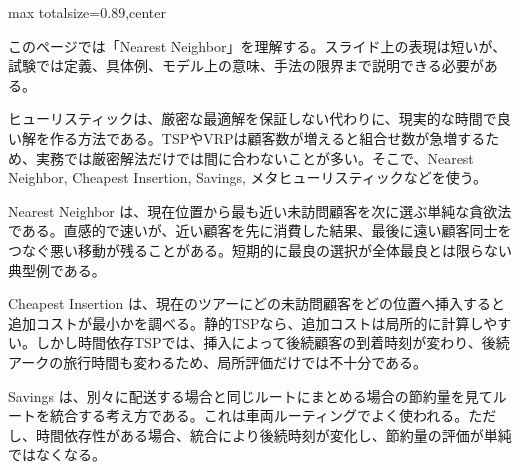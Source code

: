 \begin{minipage}[t]{0.58\textwidth}
\begin{adjustbox}{max totalsize={\textwidth}{0.89\textheight},center}
\begin{minipage}{\textwidth}\scriptsize
{}このページでは「Nearest Neighbor」を理解する。スライド上の表現は短いが、試験では定義、具体例、モデル上の意味、手法の限界まで説明できる必要がある。\par
ヒューリスティックは、厳密な最適解を保証しない代わりに、現実的な時間で良い解を作る方法である。TSPやVRPは顧客数が増えると組合せ数が急増するため、実務では厳密解法だけでは間に合わないことが多い。そこで、Nearest Neighbor, Cheapest Insertion, Savings, メタヒューリスティックなどを使う。\par
Nearest Neighbor は、現在位置から最も近い未訪問顧客を次に選ぶ単純な貪欲法である。直感的で速いが、近い顧客を先に消費した結果、最後に遠い顧客同士をつなぐ悪い移動が残ることがある。短期的に最良の選択が全体最良とは限らない典型例である。\par
Cheapest Insertion は、現在のツアーにどの未訪問顧客をどの位置へ挿入すると追加コストが最小かを調べる。静的TSPなら、追加コストは局所的に計算しやすい。しかし時間依存TSPでは、挿入によって後続顧客の到着時刻が変わり、後続アークの旅行時間も変わるため、局所評価だけでは不十分である。\par
Savings は、別々に配送する場合と同じルートにまとめる場合の節約量を見てルートを統合する考え方である。これは車両ルーティングでよく使われる。ただし、時間依存性がある場合、統合により後続時刻が変化し、節約量の評価が単純ではなくなる。\par

\end{minipage}
\end{adjustbox}
\end{minipage}

